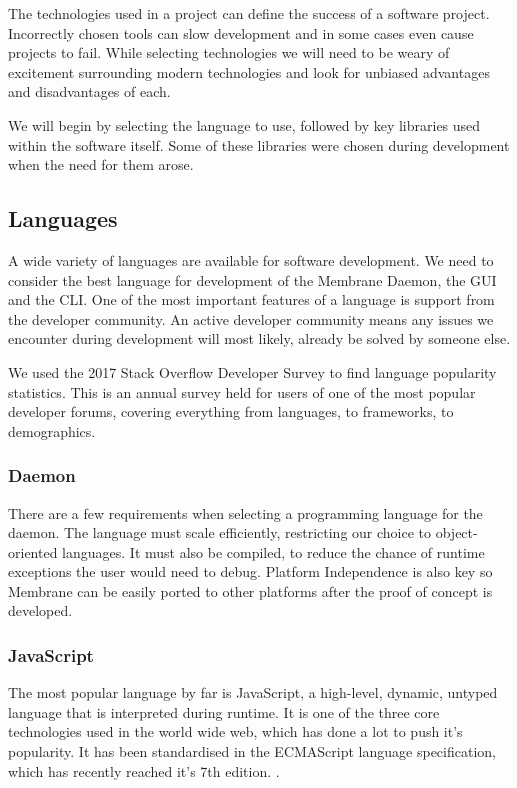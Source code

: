 \documentclass[11pt, a4paper, twocolumn, twoside]{report}
\begin{document}
The technologies used in a project can define the success of a software project. Incorrectly chosen tools can slow development and in some cases even cause projects to fail. While selecting technologies we will need to be weary of excitement surrounding modern technologies and look for unbiased advantages and disadvantages of each.

We will begin by selecting the language to use, followed by key libraries used within the software itself. Some of these libraries were chosen during development when the need for them arose.

\subsection{Languages}

A wide variety of languages are available for software development. We need to consider the best language for development of the Membrane Daemon, the GUI and the CLI. One of the most important features of a language is support from the developer community. An active developer community means any issues we encounter during development will most likely, already be solved by someone else.

We used the 2017 Stack Overflow Developer Survey \citep{stackoverflow2017survey} to find language popularity statistics. This is an annual survey held for users of one of the most popular developer forums, covering everything from languages, to frameworks, to demographics.

\subsubsection{Daemon}

There are a few requirements when selecting a programming language for the daemon. The language must scale efficiently, restricting our choice to object-oriented languages. It must also be compiled, to reduce the chance of runtime exceptions the user would need to debug. Platform Independence is also key so Membrane can be easily ported to other platforms after the proof of concept is developed.

\subsubsection{JavaScript}

The most popular language by far is JavaScript, a high-level, dynamic, untyped language that is interpreted during runtime. \citep{flanagan2011javascript} It is one of the three core technologies used in the world wide web, which has done a lot to push it's popularity. It has been standardised in the ECMAScript language specification, which has recently reached it's 7th edition. \citep{stefanov2010javascript}.
\end{document}
